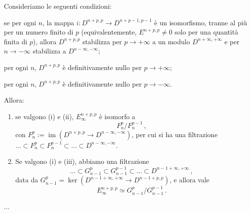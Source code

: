 \begin{prop}
	Consideriamo le seguenti condizioni:
	\begin{rmnumerate}
		\item se per ogni $n$, la mappa $i:D^{n+p,p} \to D^{n+p-1,p-1}$ è un isomorfismo,
		tranne al più per un numero finito di $p$ (equivalentemente, $E^{n+p,p} \ne 0$
		solo per una quantità finita di $p$), allora $D^{n+p,p}$
		stabilizza per $p \to + \infty$ a un modulo $D^{n+\infty,+\infty}$
		e per $n \to - \infty$ stabilizza a $D^{n-\infty,-\infty}$;
		
		\item per ogni $n$, $D^{n+p,p}$ è definitivamente nullo per $p \to +\infty$;
		
		\item per ogni $n$, $D^{n+p,p}$ è definitivamente nullo per $p \to -\infty$.
	\end{rmnumerate}
	Allora:
	\begin{enumerate}
		\item se valgono (i) e (ii), $E_{\infty}^{n+p,p}$ è isomorfo a
		\begin{equation*}
			F_{n}^{p}/F_{n}^{p-1}\,,
		\end{equation*}
		con $F_{n}^{p}:= \operatorname{im}\left( D^{n+p,p} \to D^{n-\infty, -\infty} \right)$,
		per cui si ha una filtrazione $\dots \subset F^{p}_{n} \subset F^{p-1}_{n} \subset
		\dots \subset D^{n-\infty, -\infty}$.
		
		\item Se valgono (i) e (iii), abbiamo una filtrazione
		\begin{equation*}
			\dots \subset G^{p}_{n-1} \subset G^{p-1}_{n-1} \subset 
			\dots \subset D^{n-1+\infty, +\infty}\,,
		\end{equation*}
		data da $G^{p}_{n-1}=\ker\left( D^{n-1+\infty, +\infty} \to D^{n-1+p, p} \right)$,
		e allora vale
		\begin{equation*}
			E_{\infty}^{n+p,p} \simeq G^{p}_{n-1}/G^{p-1}_{n-1}\,.
		\end{equation*}
	\end{enumerate}
\end{prop}

\begin{oss}
	...
\end{oss}


